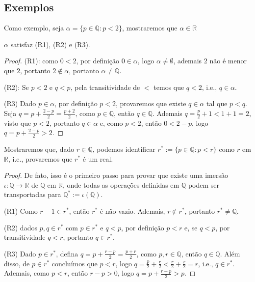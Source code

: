 \documentclass[11pt]{article}
\newcommand{\mbb}[1]{\mathbb{#1}}
\newcommand{\cl}[1]{\colorlet{shadecolor}{#1}}
\begin{document}
\subsection{Exemplos}

Como exemplo, seja $\alpha=\{p\in\mbb{Q}:p< 2\}$, mostraremos que $\alpha\in\mbb{R}$

\cl{orange!15}
\begin{shaded}
\begin{theorem}
    $\alpha$ satisfaz (R1), (R2) e (R3).
\end{theorem}
\end{shaded}

\begin{proof}
    (R1): como $0< 2$, por definição $0\in\alpha$, logo $\alpha\neq\emptyset$, ademais $2$ não é menor que $2$, portanto $2\notin\alpha$, portanto $\alpha\neq\mbb{Q}$.

    (R2): Se $p< 2$ e $q< p$, pela transitividade de $<$ temos que $q< 2$, i.e., $q\in\alpha$.
    
    (R3) Dado $p\in\alpha$, por definição $p< 2$, provaremos que existe $q\in\alpha$ tal que $p< q$. Seja $q = p + \frac{2 - p}{2} = \frac{p + 2}{2}$, como $p\in\mbb{Q}$, então $q\in\mbb{Q}$. Ademais $q=\frac{p}{2}+1< 1+1=2$, visto que $p< 2$, portanto $q\in\alpha$ e, como $p< 2$, então $0< 2-p$, logo $q=p + \frac{2-p}{2}>2$.
\end{proof}

\begin{shaded}
\begin{theorem}
    Mostraremos que, dado $r\in\mbb{Q}$, podemos identificar $r^*:=\{p\in\mbb{Q}:p< r\}$ como $r$ em $\mbb{R}$, i.e., provaremos que $r^*$ é um real.
\end{theorem}
\end{shaded}

\begin{proof}
    De fato, isso é o primeiro passo para provar que existe uma imersão $\iota:\mbb{Q}\to\mbb{R}$ de $\mbb{Q}$ em $\mbb{R}$, onde todas as operações definidas em $\mbb{Q}$ podem ser transportadas para $\mbb{Q}^*:=\iota(\mbb{Q})$.

    (R1) Como $r-1\in r^*$, então $r^*$ é não-vazio. Ademais, $r\notin r^*$, portanto $r^*\neq\mbb{Q}$.

    (R2) dados $p,q\in r^*$ com $p\in r^*$ e $q< p$, por definição $p< r$ e, se $q< p$, por transitividade $q< r$, portanto $q\in r^*$.

    (R3) Dado $p\in r^*$, defina $q=p+\frac{r-p}{2}=\frac{p+r}{2}$, como $p,r\in\mbb{Q}$, então $q\in\mbb{Q}$. Além disso, de $p\in r^*$ concluímos que $p< r$, logo $q=\frac{p}{2}+\frac{r}{2}<\frac{r}{2}+\frac{r}{2}=r$, i.e., $q\in r^*$. Ademais, como $p< r$, então $r - p > 0$, logo $q=p+\frac{r-p}{2}> p$.
\end{proof}
\end{document}
